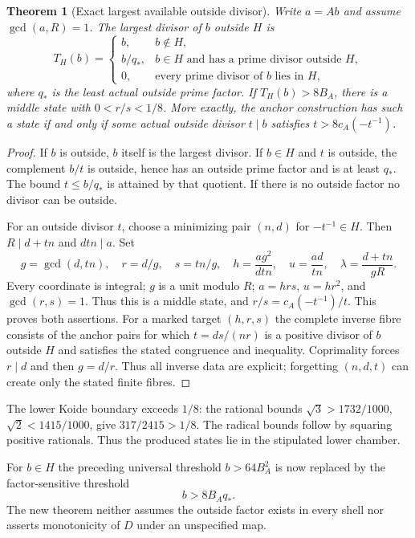 \documentclass[11pt]{article}
\newtheorem{theorem}{Theorem}[section]
\theoremstyle{definition}\newtheorem{definition}[theorem]{Definition}
\theoremstyle{remark}\newtheorem{remark}[theorem]{Remark}
\begin{document}
\begin{theorem}[Exact largest available outside divisor]\label{thm:cofactor}
Write $a=Ab$ and assume $\gcd(a,R)=1$. The largest divisor of $b$ outside $H$
is
\[
 T_H(b)=
 \begin{cases}
 b,&b\notin H,\\
 b/q_*,&b\in H\text{ and has a prime divisor outside }H,\\
 0,&\text{every prime divisor of }b\text{ lies in }H,
 \end{cases}
\]
where $q_*$ is the least actual outside prime factor.
If $T_H(b)>8B_A$, there is a middle state with $0<r/s<1/8$.
More exactly, the anchor construction has such a state if and only if
some actual outside divisor $t\mid b$ satisfies
$t>8c_A(-t^{-1})$.
\end{theorem}
\begin{proof}
If $b$ is outside, $b$ itself is the largest divisor. If $b\in H$ and $t$
is outside, the complement $b/t$ is outside, hence has an outside prime
factor and is at least $q_*$. The bound $t\le b/q_*$ is attained by that
quotient. If there is no outside factor no divisor can be outside.

For an outside divisor $t$, choose a minimizing pair $(n,d)$ for
$-t^{-1}\in H$. Then $R\mid d+tn$ and $dtn\mid a$. Set
\[
 g=\gcd(d,tn),\quad r=d/g,\quad s=tn/g,\quad
 h=\frac{ag^2}{dtn},\quad u=\frac{ad}{tn},\quad
 \lambda=\frac{d+tn}{gR}.
\]
Every coordinate is integral; $g$ is a unit modulo $R$;
$a=hrs$, $u=hr^2$, and $\gcd(r,s)=1$. Thus this is a middle state,
and $r/s=c_A(-t^{-1})/t$. This proves both assertions. For a marked target
$(h,r,s)$ the complete inverse fibre consists of the anchor pairs for which
$t=ds/(nr)$ is a positive divisor of $b$ outside $H$ and satisfies the
stated congruence and inequality. Coprimality forces $r\mid d$ and then
$g=d/r$. Thus all inverse data are explicit; forgetting $(n,d,t)$ can
create only the stated finite fibres.
\end{proof}
The lower Koide boundary exceeds $1/8$: the rational bounds
$\sqrt3>1732/1000$, $\sqrt2<1415/1000$, give
$317/2415>1/8$. The radical bounds follow by squaring positive rationals.
Thus the produced states lie in the stipulated lower chamber.

For $b\in H$ the preceding universal threshold $b>64B_A^2$ is now replaced
by the factor-sensitive threshold
\[
 \boxed{b>8B_Aq_*.}
\]
The new theorem neither assumes the outside factor exists in every shell
nor asserts monotonicity of $D$ under an unspecified map.
\end{document}
